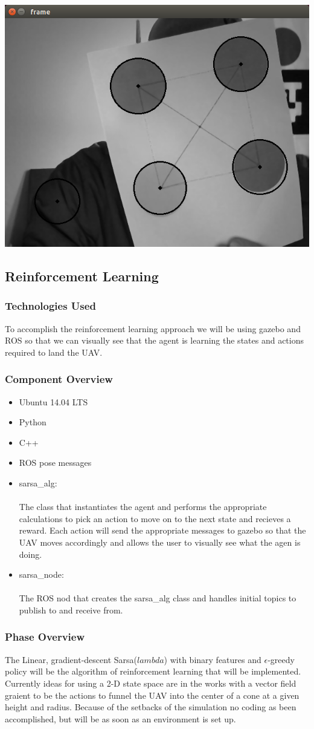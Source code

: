 \begin{center} \includegraphics[width=.5\textwidth]{images/circles.png} \end{center}

\subsection{Reinforcement Learning}
\subsubsection{Technologies  Used}
To accomplish the reinforcement learning approach we will be using gazebo and ROS so that we can visually see that the agent is learning the states and actions required to land the UAV.  
\subsubsection{Component  Overview}
\begin{itemize}
  \item Ubuntu 14.04 LTS
  \item Python
  \item C++
  \item ROS pose messages
  \item sarsa\_alg: \\
  \\
  The class that instantiates the agent and performs the appropriate calculations to pick an action to move on to the next state and recieves a reward. Each action will send the appropriate messages to gazebo so that the UAV moves accordingly and allows the user to visually see what the agen is doing.
  \item sarsa\_node: \\
  \\
  The ROS nod that creates the sarsa\_alg class and handles initial topics to publish to and receive from.
\end{itemize}
\subsubsection{Phase Overview}
The Linear, gradient-descent Sarsa($lambda$) with binary features and $\epsilon$-greedy policy will be the algorithm of reinforcement learning that will be implemented. Currently ideas for using a 2-D state space are in the works with a vector field graient to be the actions to funnel the UAV into the center of a cone at a given height and radius. Because of the setbacks of the simulation no coding as been accomplished, but will be as soon as an environment is set up.

